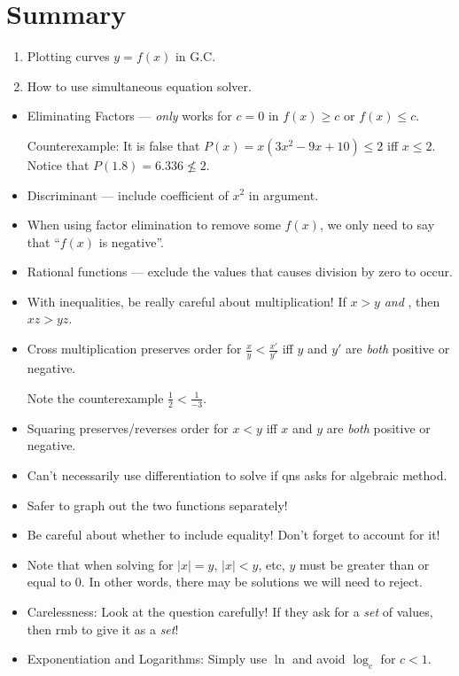 \documentclass[oneside]{book}
\begin{document}
\section{Summary}

\begin{GCSkills}{}
  \begin{enumerate}
    \item Plotting curves \(y=f(x)\) in G.C.
    \item How to use simultaneous equation solver.
  \end{enumerate}
\end{GCSkills}
\begin{IN}
  \begin{itemize}
    \item Eliminating Factors --- \emph{only} works for \(c=0\) in \(f(x) \geq c\) or \(f(x) \leq c\).

    Counterexample: It is false that \(P(x)=x(3x^2-9x+10) \leq 2\) iff \(x \leq 2\). Notice that \(P(1.8)=6.336 \not\leq 2\). 
    \item Discriminant --- include coefficient of \(x^2\) in argument.
    \item When using factor elimination to remove some \(f(x)\), we only need to say that ``\(f(x)\) is negative''.
    \item Rational functions --- exclude the values that causes division by zero to occur.
    \item With inequalities, be really careful about multiplication! If \(x>y\) \emph{and} , then \(xz>yz\). 
    \item Cross multiplication preserves order for \(\frac{x}{y}<\frac{x'}{y'}\) iff \(y\) and \(y'\) are \emph{both} positive or negative.
    
    Note the counterexample \(\frac{1}{2}<\frac{1}{-3}\).
    \item Squaring preserves/reverses order for \(x<y\) iff \(x\) and \(y\) are \emph{both} positive or negative.
    \item Can't necessarily use differentiation to solve if qns asks for algebraic method.
    \item Safer to graph out the two functions separately!
    \item Be careful about whether to include equality! Don't forget to account for it!
    \item  Note that when solving for \(\lvert x \rvert=y\), \(\lvert x \rvert < y\), etc, \(y\) must be greater than or equal to 0. In other words, there may be solutions we will need to reject.
    \item Carelessness: Look at the question carefully! If they ask for a \emph{set} of values, then rmb to give it as a \emph{set}!
    \item Exponentiation and Logarithms: Simply use \(\ln\) and avoid \(\log_c\) for \(c<1\).
    

\end{itemize}
\end{IN}
\end{document}
